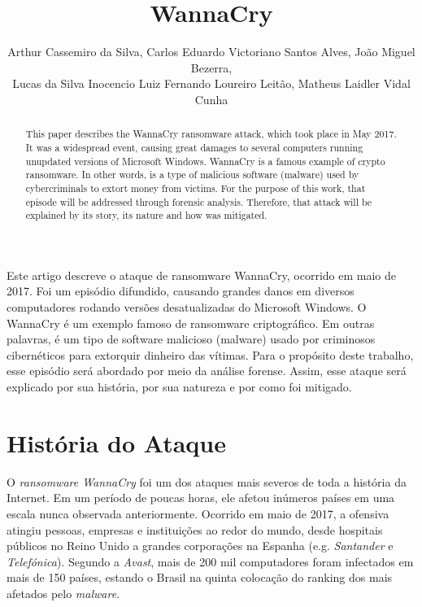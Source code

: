 \documentclass[12pt]{article}
\title{WannaCry}
\author{
Arthur Cassemiro da Silva\inst{1},
Carlos Eduardo Victoriano Santos Alves\inst{1},
João Miguel Bezerra\inst{1}, \\
Lucas da Silva Inocencio\inst{1}
Luiz Fernando Loureiro Leitão\inst{2},
Matheus Laidler Vidal Cunha\inst{2}
}
\begin{document}
 

\maketitle

\begin{abstract}
  This paper describes the WannaCry ransomware attack, which took place in May 2017. It was
  a widespread event, causing great damages to several computers running unupdated versions
  of Microsoft Windows. WannaCry is a famous example of crypto ransomware. In other words,
  is a type of malicious software (malware) used by cybercriminals to extort money from
  victims. For the purpose of this work, that episode will be addressed through forensic
  analysis. Therefore, that attack will be explained by its story, its nature and how was
  mitigated. 
\end{abstract}
     
\begin{resumo} 
  Este artigo descreve o ataque de ransomware WannaCry, ocorrido em maio de 2017. Foi um
  episódio difundido, causando grandes danos em diversos computadores rodando versões
  desatualizadas do Microsoft Windows. O WannaCry é um exemplo famoso de ransomware
  criptográfico. Em outras palavras, é um tipo de software malicioso (malware) usado por
  criminosos cibernéticos para extorquir dinheiro das vítimas. Para o propósito deste trabalho,
  esse episódio será abordado por meio da análise forense. Assim, esse ataque será explicado
  por sua história, por sua natureza e por como foi mitigado.
\end{resumo}





\section{História do Ataque}
O \textit{ransomware WannaCry} foi um dos ataques mais severos de toda a história da Internet. Em um período de poucas horas, ele afetou inúmeros países em uma escala nunca observada anteriormente. Ocorrido em maio de 2017, a ofensiva atingiu pessoas, empresas e instituições ao redor do mundo, desde hospitais públicos no Reino Unido a grandes corporações na Espanha (e.g. \textit{Santander} e \textit{Telefónica}). Segundo a \textit{Avast}, mais de 200 mil computadores foram infectados em mais de 150 países, estando o Brasil na quinta colocação do ranking dos mais afetados pelo \textit{malware}.
\end{document}
